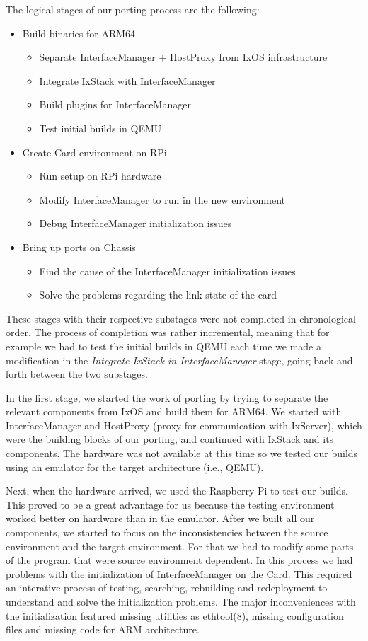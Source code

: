The logical stages of our porting process are the following:
\begin{itemize}
    \item Build binaries for ARM64
    \begin{itemize}
        \item Separate InterfaceManager + HostProxy from IxOS infrastructure
        \item Integrate IxStack with InterfaceManager
        \item Build plugins for InterfaceManager
        \item Test initial builds in QEMU
    \end{itemize}
    \item Create Card environment on RPi
    \begin{itemize}
        \item Run setup on RPi hardware
        \item Modify InterfaceManager to run in the new environment
        \item Debug InterfaceManager initialization issues
    \end{itemize}
    \item Bring up ports on Chassis
    \begin{itemize}
        \item Find the cause of the InterfaceManager initialization issues
        \item Solve the problems regarding the link state of the card
    \end{itemize}
\end{itemize}
These stages with their respective substages were not completed in chronological
order. The process of completion was rather incremental, meaning that for
example we had to test the initial builds in QEMU each time we made a
modification in the \textit{Integrate IxStack in InterfaceManager} stage, going back and forth
between the two substages.

In the first stage, we started the work of porting by trying to separate the
relevant components from IxOS and build them for ARM64. We started with
InterfaceManager and HostProxy (proxy for communication with IxServer), which
were the building blocks of our porting, and continued with IxStack and its
components. The hardware was not available at this time so we tested our builds
using an emulator for the target architecture (i.e., QEMU).

Next, when the hardware arrived, we used the Raspberry Pi to test our builds.
This proved to be a great advantage for us because the testing environment
worked better on hardware than in the emulator. After we built all our
components, we started to focus on the inconsistencies between the source
environment and the target environment. For that we had to modify some parts of
the program that were source environment dependent. In this process we had
problems with the initialization of InterfaceManager on the Card. This required
an interative process of testing, searching, rebuilding and redeployment to
understand and solve the initialization problems. The major inconveniences with
the initialization featured missing utilities as ethtool(8), missing
configuration files and missing code for ARM architecture.

